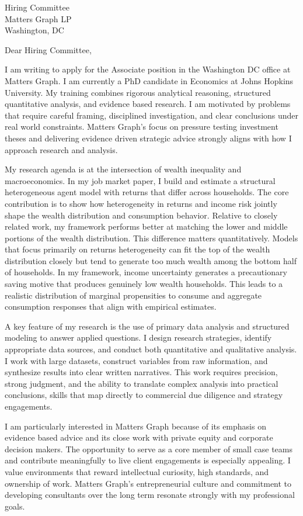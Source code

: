 \documentclass[11pt]{letter}
\begin{document}
\begin{letter}{Hiring Committee \\ Matters Graph LP \\ Washington, DC}

\opening{Dear Hiring Committee,}

I am writing to apply for the Associate position in the Washington DC office at Matters Graph. I am currently a PhD candidate in Economics at Johns Hopkins University. My training combines rigorous analytical reasoning, structured quantitative analysis, and evidence based research. I am motivated by problems that require careful framing, disciplined investigation, and clear conclusions under real world constraints. Matters Graph’s focus on pressure testing investment theses and delivering evidence driven strategic advice strongly aligns with how I approach research and analysis.

My research agenda is at the intersection of wealth inequality and macroeconomics. In my job market paper, I build and estimate a structural heterogeneous agent model with returns that differ across households. The core contribution is to show how heterogeneity in returns and income risk jointly shape the wealth distribution and consumption behavior. Relative to closely related work, my framework performs better at matching the lower and middle portions of the wealth distribution. This difference matters quantitatively. Models that focus primarily on returns heterogeneity can fit the top of the wealth distribution closely but tend to generate too much wealth among the bottom half of households. In my framework, income uncertainty generates a precautionary saving motive that produces genuinely low wealth households. This leads to a realistic distribution of marginal propensities to consume and aggregate consumption responses that align with empirical estimates.

A key feature of my research is the use of primary data analysis and structured modeling to answer applied questions. I design research strategies, identify appropriate data sources, and conduct both quantitative and qualitative analysis. I work with large datasets, construct variables from raw information, and synthesize results into clear written narratives. This work requires precision, strong judgment, and the ability to translate complex analysis into practical conclusions, skills that map directly to commercial due diligence and strategy engagements.

I am particularly interested in Matters Graph because of its emphasis on evidence based advice and its close work with private equity and corporate decision makers. The opportunity to serve as a core member of small case teams and contribute meaningfully to live client engagements is especially appealing. I value environments that reward intellectual curiosity, high standards, and ownership of work. Matters Graph’s entrepreneurial culture and commitment to developing consultants over the long term resonate strongly with my professional goals.


\end{letter}
\end{document}
